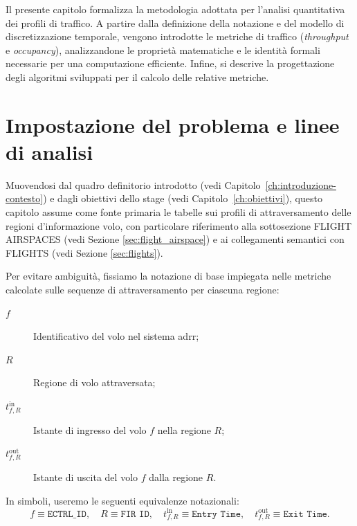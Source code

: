 \label{ch:ch4}
Il presente capitolo formalizza la metodologia adottata per l'analisi quantitativa dei profili di traffico. A partire dalla definizione della notazione e del modello di discretizzazione temporale, vengono introdotte le metriche di traffico (\emph{throughput} e \emph{occupancy}), analizzandone le proprietà matematiche e le identità formali necessarie per una computazione efficiente. Infine, si descrive la progettazione degli algoritmi sviluppati per il calcolo delle relative metriche.
\section{Impostazione del problema e linee di analisi}
Muovendosi dal quadro definitorio introdotto (vedi  Capitolo~\ref{ch:introduzione-contesto}) e dagli obiettivi dello stage (vedi Capitolo~\ref{ch:obiettivi}), questo capitolo assume come fonte primaria le tabelle sui profili di attraversamento delle regioni d’informazione volo, con particolare riferimento alla sottosezione \textsc{FLIGHT AIRSPACES} (vedi Sezione \ref{sec:flight_airspace}) e ai collegamenti semantici con \textsc{FLIGHTS} (vedi Sezione \ref{sec:flights}).

Per evitare ambiguità, fissiamo la notazione di base impiegata nelle metriche calcolate sulle sequenze di attraversamento per ciascuna regione:
\begin{description}
  \item[$f$] Identificativo del volo nel sistema \gls{adrr};
  \item[$R$] Regione di volo attraversata;
  \item[$t^{\mathrm{in}}_{f,R}$] Istante di ingresso del volo \(f\) nella regione \(R\);
  \item[$t^{\mathrm{out}}_{f,R}$] Istante di uscita del volo \(f\) dalla regione \(R\).
\end{description}
In simboli, useremo le seguenti equivalenze notazionali:
\[
  f \equiv \texttt{ECTRL\_ID},\quad
  R \equiv \texttt{FIR ID},\quad
  t^{\mathrm{in}}_{f,R} \equiv \texttt{Entry Time},\quad
  t^{\mathrm{out}}_{f,R} \equiv \texttt{Exit Time}.
\]
\clearpage
